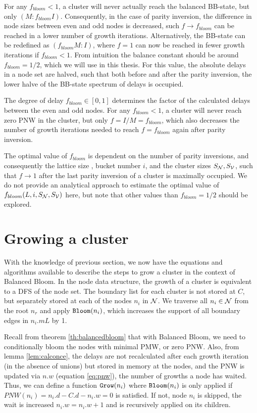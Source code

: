 For any $f_{bloom} < 1$, a cluster will never actually reach the balanced BB-state, but only $(M:f_{bloom}I)$. Consequently, in the case of parity inversion, the difference in node sizes between even and odd nodes is decreased, such $f\to f_{bloom}$ can be reached in a lower number of growth iterations. Alternatively, the BB-state can be redefined as $(f_{bloom}M:I)$, where $f=1$ can now be reached in fewer growth iterations if $f_{bloom} <1$.  From intuition the balance constant should be around $f_{bloom} = 1/2$, which we will use in this thesis. For this value, the absolute delays in a node set are halved, such that both before and after the parity inversion, the lower halve of the BB-state spectrum of delays is occupied.
\begin{theorem}
  The degree of delay $f_{bloom} \in [0, 1]$ determines the factor of the calculated delays between the even and odd nodes. For any $f_{bloom} < 1$, a cluster will never reach zero PNW in the cluster, but only $f=I/M=f_{bloom}$, which also decreases the number of growth iterations needed to reach $f=f_{bloom}$ again after parity inversion.
\end{theorem}

The optimal value of $f_{bloom}$ is dependent on the number of parity inversions, and consequently the lattice size , bucket number $i$, and the cluster sizes $S_{\mathcal{N}}, S_{\mathcal{V}}$, such that $f\to1$ after the last parity inversion of a cluster is maximally occupied. We do not provide an analytical approach to estimate the optimal value of $f_{bloom}(L, i, S_{\mathcal{N}}, S_{\mathcal{V}})$ here, but note that other values than $f_{bloom} = 1/2$ should be explored. \\

\section{Growing a cluster}\label{sec:growingcluster}
With the knowledge of previous section, we now have the equations and algorithms available to describe the steps to grow a cluster in the context of Balanced Bloom. In the node data structure, the growth of a cluster is equivalent to a DFS of the node set. The boundary list for each cluster is not stored at $C$, but separately stored at each of the nodes $n_i$ in $\mathcal{N}$. We traverse all $n_i \in \mathcal{N}$ from the root $n_r$ and apply $\texttt{Bloom}(n_i)$, which increases the support of all boundary edges in $n_i.m{L}$ by 1.

Recall from theorem \ref{th:balancedbloom} that with Balanced Bloom, we need to conditionally bloom the nodes with minimal PMW, or zero PNW. Also, from lemma \ref{lem:calconce}, the delays are not recalculated after each growth iteration (in the absence of unions) but stored in memory at the nodes, and the PNW is updated via $n.w$ (equation \eqref{eq:pnw}), the number of growths a node has waited. Thus, we can define a function $\texttt{Grow}(n_i)$ where $\texttt{Bloom}(n_i)$ is only applied if $PNW(n_i) = n_i.d - C.d - n_i.w = 0$ is satisfied. If not, node $n_i$ is skipped, the wait is increased $n_i.w = n_i.w +1$ and  is recursively applied on its children.

